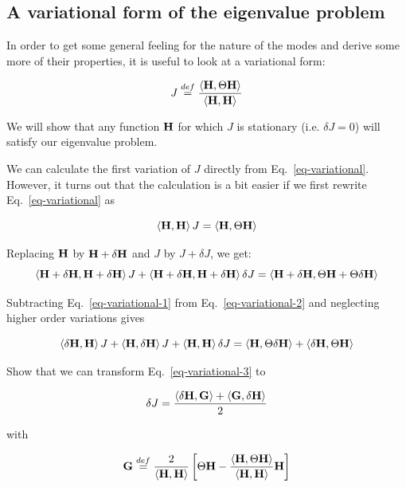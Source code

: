 \subsection{A variational form of the eigenvalue problem}

In order to get some general feeling for the nature of the modes and derive some more of their properties, it is useful to look at a variational form:

\begin{equation}
J \stackrel{def}{=} \frac{\left\langle {\bf H} , \Theta {\bf H}\right\rangle}{\left\langle {\bf H} , {\bf H}\right\rangle} \label{eq-variational}
\end{equation}  

We will show that any function ${\bf H}$ for which $J$ is stationary (i.e. $\delta J=0$) will satisfy our eigenvalue problem.

We can calculate the first variation of $J$ directly from Eq.~\ref{eq-variational}. However, it turns out that the calculation is a bit easier if we first rewrite Eq.~\ref{eq-variational} as

\begin{equation}
\left\langle {\bf H},{\bf H} \right\rangle J = \left\langle {\bf H},\Theta {\bf H} \right\rangle \label{eq-variational-1}
\end{equation} 

Replacing ${\bf H}$ by ${\bf H} + \delta {\bf H}$ and $J$ by $J+ \delta J$, we get:
\begin{equation}
\left\langle {\bf H+\delta {\bf H}},{\bf H}+\delta {\bf H} \right\rangle J + \left\langle {\bf H}+\delta {\bf H},{\bf H+\delta {\bf H}} \right\rangle \delta  J= \left\langle {\bf H}+\delta {\bf H},\Theta {\bf H} + \Theta \delta {\bf H} \right\rangle \label{eq-variational-2}
\end{equation} 

Subtracting Eq.~\ref{eq-variational-1} from Eq.~\ref{eq-variational-2} and neglecting higher order variations gives

\begin{equation}
\left\langle \delta {\bf H},{\bf H} \right\rangle J + \left\langle {\bf H},\delta {\bf H} \right\rangle J + \left\langle {\bf H}, {\bf H} \right\rangle \delta J = \left\langle {\bf H},\Theta \delta {\bf H} \right\rangle + \left\langle \delta {\bf H},\Theta {\bf H} \right\rangle \label{eq-variational-3}
\end{equation} 

\begin{sidebar}
\begin{ex}
Show that we can transform Eq.~\ref{eq-variational-3} to

$$\delta J = \frac {\left\langle \delta {\bf H} , {\bf G} \right\rangle + \left\langle {\bf G} , \delta {\bf H} \right\rangle}{2}$$

with

$${\bf G} \stackrel{def}{=} \frac{2}{\left\langle {\bf H} , {\bf H}\right\rangle } \left[ \Theta {\bf H} - \frac{\left\langle {\bf H} , \Theta {\bf H}\right\rangle}{\left\langle {\bf H} , {\bf H}\right\rangle} {\bf H} \right]  $$
\end{ex}
\end{sidebar}

